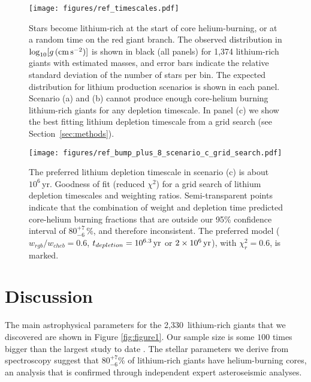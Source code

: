 \documentclass[twocolumn]{aastex62}
\newcommand{\SampleSize}{2,330}
\newcommand{\logg}{\log_{10}[g\,({\rm cm\,s}^{-2})]}
\begin{document}
\begin{figure*}[t!]
	\texttt{[image: figures/ref\_timescales.pdf]}
	\caption{{Stars become lithium-rich at the start of core helium-burning, or at a random time on the red giant branch.} The observed distribution in $\logg$ is shown in black (all panels) for 1,374 lithium-rich giants with estimated masses, and error bars indicate the relative standard deviation of the number of stars per bin. The expected distribution for lithium production scenarios is shown in each panel. Scenario (a) and (b) cannot produce enough core-helium burning lithium-rich giants for any depletion timescale. In panel (c) we show the best fitting lithium depletion timescale from a grid search (see Section~\ref{sec:methods}).}
	\label{fig:evtracks}
\end{figure*}



\begin{figure}
	\texttt{[image: figures/ref\_bump\_plus\_8\_scenario\_c\_grid\_search.pdf]}
	\caption{The preferred  lithium depletion timescale in scenario (c) is about $10^6$\,yr. Goodness of fit (reduced $\chi^2$) for a grid search of lithium depletion timescales and weighting ratios. Semi-transparent points indicate that the combination of weight and depletion time predicted core-helium burning fractions that are outside our 95\% confidence interval of $80^{+7}_{-6}$\,\%, and therefore inconsistent.  The preferred model ($w_{rgb}/w_{cheb} = 0.6$, $t_{depletion} = 10^{6.3}\,{\rm yr}$ or $2\times10^6\,{\rm yr}$), with $\chi_r^2 = 0.6$, is marked.}
	\label{fig:grid_search}
\end{figure}



\section{Discussion} \label{sec:discussion}

The main astrophysical parameters for the \SampleSize\ lithium-rich giants
that we discovered are shown in Figure \ref{fig:figure1}.  Our sample size
is some $100$ times bigger than the largest study to date \citep{Martell_2013}.
The stellar parameters we derive from spectroscopy suggest that $80^{+7}_{-6}$\% of lithium-rich 
giants have helium-burning cores, an analysis that is confirmed through independent expert
asteroseismic analyses. 
\end{document}
